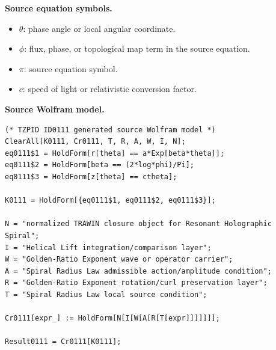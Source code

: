 \begin{minipage}[t]{0.49\linewidth}
\begingroup
\small
\raggedright
\textbf{Source equation symbols.}\par
\begin{itemize}[leftmargin=1.35em,itemsep=1pt,topsep=1pt,parsep=0pt]
    \item $\theta$: phase angle or local angular coordinate.
    \item $\phi$: flux, phase, or topological map term in the source equation.
    \item $\pi$: source equation symbol.
    \item $c$: speed of light or relativistic conversion factor.
\end{itemize}
\endgroup
\end{minipage}\hfill
\begin{minipage}[t]{0.47\linewidth}
\begingroup
\scriptsize
\raggedright
\textbf{Source Wolfram model.}\par
\begin{Verbatim}[fontsize=\tiny,breaklines=true,breakanywhere=true]
(* TZPID ID0111 generated source Wolfram model *)
ClearAll[K0111, Cr0111, T, R, A, W, I, N];
eq0111$1 = HoldForm[r[theta] == a*Exp[beta*theta]];
eq0111$2 = HoldForm[beta == (2*log*phi)/Pi];
eq0111$3 = HoldForm[z[theta] == ctheta];

K0111 = HoldForm[{eq0111$1, eq0111$2, eq0111$3}];

N = "normalized TRAWIN closure object for Resonant Holographic Spiral";
I = "Helical Lift integration/comparison layer";
W = "Golden-Ratio Exponent wave or operator carrier";
A = "Spiral Radius Law admissible action/amplitude condition";
R = "Golden-Ratio Exponent rotation/curl preservation layer";
T = "Spiral Radius Law local source condition";

Cr0111[expr_] := HoldForm[N[I[W[A[R[T[expr]]]]]]];

Result0111 = Cr0111[K0111];
\end{Verbatim}
\endgroup
\end{minipage}

